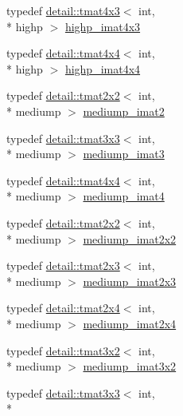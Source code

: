 \begin{DoxyCompactItemize}
typedef \hyperlink{structglm_1_1detail_1_1tmat4x3}{detail\-::tmat4x3}$<$ int, \\*
highp $>$ \hyperlink{group__gtc__matrix__integer_ga9d51b6f1c8cd0b23c6fcc8dca924b14c}{highp\-\_\-imat4x3}
\item 
typedef \hyperlink{structglm_1_1detail_1_1tmat4x4}{detail\-::tmat4x4}$<$ int, \\*
highp $>$ \hyperlink{group__gtc__matrix__integer_ga969c88d5c7530beb80768205a054ee80}{highp\-\_\-imat4x4}
\item 
typedef \hyperlink{structglm_1_1detail_1_1tmat2x2}{detail\-::tmat2x2}$<$ int, \\*
mediump $>$ \hyperlink{group__gtc__matrix__integer_gaec03a8eef2ec2536f8bebffd0bac8192}{mediump\-\_\-imat2}
\item 
typedef \hyperlink{structglm_1_1detail_1_1tmat3x3}{detail\-::tmat3x3}$<$ int, \\*
mediump $>$ \hyperlink{group__gtc__matrix__integer_ga6b438ab863af0122b532adc93b89105e}{mediump\-\_\-imat3}
\item 
typedef \hyperlink{structglm_1_1detail_1_1tmat4x4}{detail\-::tmat4x4}$<$ int, \\*
mediump $>$ \hyperlink{group__gtc__matrix__integer_gabf1a0fd4c85a21f67535b737e1feb355}{mediump\-\_\-imat4}
\item 
typedef \hyperlink{structglm_1_1detail_1_1tmat2x2}{detail\-::tmat2x2}$<$ int, \\*
mediump $>$ \hyperlink{group__gtc__matrix__integer_ga472222f6e3754124ee9cb64acaaedac1}{mediump\-\_\-imat2x2}
\item 
typedef \hyperlink{structglm_1_1detail_1_1tmat2x3}{detail\-::tmat2x3}$<$ int, \\*
mediump $>$ \hyperlink{group__gtc__matrix__integer_gabc92c714c2d257213c5b0771669df177}{mediump\-\_\-imat2x3}
\item 
typedef \hyperlink{structglm_1_1detail_1_1tmat2x4}{detail\-::tmat2x4}$<$ int, \\*
mediump $>$ \hyperlink{group__gtc__matrix__integer_ga90b020de8489a1d4424c0ffcc17c83dd}{mediump\-\_\-imat2x4}
\item 
typedef \hyperlink{structglm_1_1detail_1_1tmat3x2}{detail\-::tmat3x2}$<$ int, \\*
mediump $>$ \hyperlink{group__gtc__matrix__integer_ga2a90775c74656b8a825f24d510f0ea5d}{mediump\-\_\-imat3x2}
\item 
typedef \hyperlink{structglm_1_1detail_1_1tmat3x3}{detail\-::tmat3x3}$<$ int, \\*

\end{DoxyCompactItemize}
